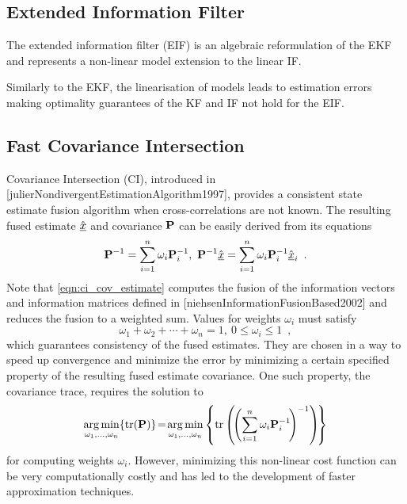 % 
% 

\subsection{Extended Information Filter}
The extended information filter (EIF) is an algebraic reformulation of the EKF and represents a non-linear model extension to the linear IF. 



Similarly to the EKF, the linearisation of models leads to estimation errors making optimality guarantees of the KF and IF not hold for the EIF.



% 
% 

\subsection{Fast Covariance Intersection}
Covariance Intersection (CI), introduced in [julierNondivergentEstimationAlgorithm1997], provides a consistent state estimate fusion algorithm when cross-correlations are not known. The resulting fused estimate $\hat{{\underline{x}}}$ and covariance ${{\mathbf{P}}}$ can be easily derived from its equations
\begin{equation}
   {\ensuremath{{\mathbf{P}}}}^{-1}=\sum_{i=1}^{n}\omega_i {{\mathbf{P}}}_i^{-1},\ {{\mathbf{P}}}^{-1} \hat{{\underline{x}}} =\sum_{i=1}^{n}\omega_i {{\mathbf{P}}}_i^{-1} \hat{{\underline{x}}}_i\enspace. \label{eqn:ci_cov_estimate}
\end{equation}
Note that \eqref{eqn:ci_cov_estimate} computes the fusion of the information vectors and information matrices defined in [niehsenInformationFusionBased2002] and reduces the fusion to a weighted sum. Values for weights $\omega_i$ must satisfy
\begin{equation}
   \omega_1 + \omega_2 + \cdots + \omega_n = 1,\ 0 \leq \omega_i \leq 1\enspace, \label{eqn:ci_omega_sum_bound}
\end{equation}
which guarantees consistency of the fused estimates. They are chosen in a way to speed up convergence and minimize the error by minimizing a certain specified property of the resulting fused estimate covariance. One such property, the covariance trace, requires the solution to
\begin{equation}
   \operatorname*{arg\,min}_{\omega_1,\dots,\omega_n} \{\operatorname{tr}({{\mathbf{P}}})\}\! =\! \operatorname*{arg\,min}_{\omega_1,\dots,\omega_n} \left\{\operatorname{tr}\left(\!\left(\sum_{i=1}^{n}\omega_i {{\mathbf{P}}}_i^{-1}\!\right)^{-1}\right)\!\right\} \label{eqn:ci_trace_min}
\end{equation}
for computing weights $\omega_i$. However, minimizing this non-linear cost function can be very computationally costly and has led to the development of faster approximation techniques.

